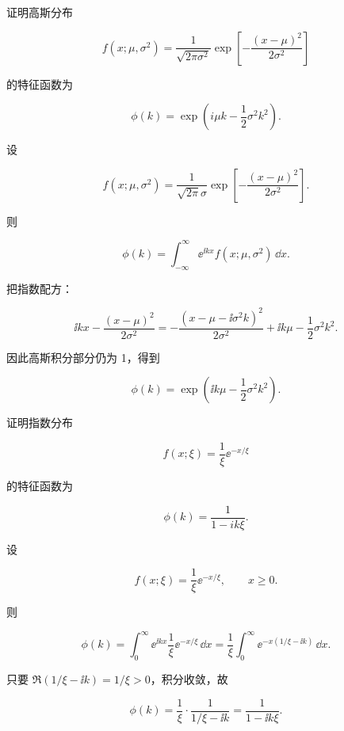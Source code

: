 ﻿


\begin{question}
证明高斯分布

\[
f(x;\mu,\sigma^2)=\frac{1}{\sqrt{2\pi\sigma^2}}\exp\left[-\frac{(x-\mu)^2}{2\sigma^2}\right]
\]

的特征函数为

\[
\phi(k)=\exp\left(i\mu k-\frac12\sigma^2k^2\right).
\]
\begin{solution}
设

\[
f(x;\mu,\sigma^2)=\frac{1}{\sqrt{2\pi}\sigma}\exp\!\left[-\frac{(x-\mu)^2}{2\sigma^2}\right].
\]

则

\[
\phi(k)=\int_{-\infty}^{\infty} \ee^{\ii kx} f(x;\mu,\sigma^2)\,\dd{x}.
\]

把指数配方：

\[
\ii kx-\frac{(x-\mu)^2}{2\sigma^2}
=
-\frac{(x-\mu-\ii\sigma^2 k)^2}{2\sigma^2}+\ii k\mu-\frac12\sigma^2k^2.
\]

因此高斯积分部分仍为 1，得到

\[
\phi(k)=\exp\!\left(\ii k\mu-\frac12\sigma^2k^2\right).
\]
\end{solution}
\end{question}


\begin{question}
证明指数分布

\[
f(x;\xi)=\frac1\xi \ee^{-x/\xi}
\]

的特征函数为

\[
\phi(k)=\frac{1}{1-ik\xi}.
\]
\begin{solution}
设

\[
f(x;\xi)=\frac1{\xi}\ee^{-x/\xi},\qquad x\ge 0.
\]

则

\[
\phi(k)=\int_0^\infty \ee^{\ii kx}\frac1{\xi}\ee^{-x/\xi}\,\dd{x}
=\frac1{\xi}\int_0^\infty \ee^{-x(1/\xi-\ii k)}\,\dd{x}.
\]

只要 \(\Re(1/\xi-\ii k)=1/\xi>0\)，积分收敛，故

\[
\phi(k)=\frac1{\xi}\cdot \frac1{1/\xi-\ii k}
=\frac1{1-\ii k\xi}.
\]
\end{solution}
\end{question}


